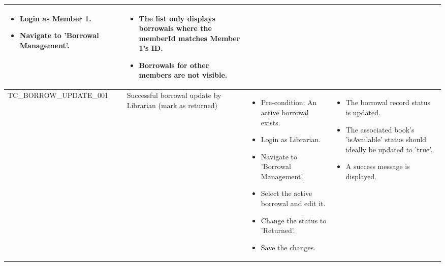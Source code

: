 \begin{longtable}{|>{\scriptsize\raggedright\arraybackslash}p{4.2cm}|>{\raggedright\arraybackslash}p{3.5cm}|>{\raggedright\arraybackslash}p{3.5cm}|>{\raggedright\arraybackslash}p{3.8cm}|}
\begin{itemize}[noitemsep, topsep=0pt, partopsep=0pt, leftmargin=*]
        \item Login as Member 1.
        \item Navigate to 'Borrowal Management'.
    \end{itemize} & 
    \begin{itemize}[noitemsep, topsep=0pt, partopsep=0pt, leftmargin=*]
        \item The list only displays borrowals where the memberId matches Member 1's ID.
        \item Borrowals for other members are not visible.
    \end{itemize} \\ \hline
TC\_BORROW\_UPDATE\_001 & Successful borrowal update by Librarian (mark as returned) & 
    \begin{itemize}[noitemsep, topsep=0pt, partopsep=0pt, leftmargin=*]
        \item Pre-condition: An active borrowal exists.
        \item Login as Librarian.
        \item Navigate to 'Borrowal Management'.
        \item Select the active borrowal and edit it.
        \item Change the status to 'Returned'.
        \item Save the changes.
    \end{itemize} & 
    \begin{itemize}[noitemsep, topsep=0pt, partopsep=0pt, leftmargin=*]
        \item The borrowal record status is updated.
        \item The associated book's 'isAvailable' status should ideally be updated to 'true'.
        \item A success message is displayed.
    \end{itemize} \\ \hline


\end{longtable}
